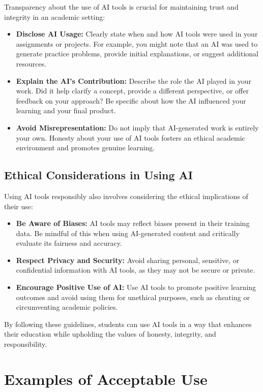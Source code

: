 \documentclass{article}
\begin{document}
Transparency about the use of AI tools is crucial for maintaining trust and integrity in an academic setting:

\begin{itemize}
    \item \textbf{Disclose AI Usage:} Clearly state when and how AI tools were used in your assignments or projects. For example, you might note that an AI was used to generate practice problems, provide initial explanations, or suggest additional resources.
    \item \textbf{Explain the AI’s Contribution:} Describe the role the AI played in your work. Did it help clarify a concept, provide a different perspective, or offer feedback on your approach? Be specific about how the AI influenced your learning and your final product.
    \item \textbf{Avoid Misrepresentation:} Do not imply that AI-generated work is entirely your own. Honesty about your use of AI tools fosters an ethical academic environment and promotes genuine learning.
\end{itemize}

\subsection{Ethical Considerations in Using AI}

Using AI tools responsibly also involves considering the ethical implications of their use:

\begin{itemize}
    \item \textbf{Be Aware of Biases:} AI tools may reflect biases present in their training data. Be mindful of this when using AI-generated content and critically evaluate its fairness and accuracy.
    \item \textbf{Respect Privacy and Security:} Avoid sharing personal, sensitive, or confidential information with AI tools, as they may not be secure or private.
    \item \textbf{Encourage Positive Use of AI:} Use AI tools to promote positive learning outcomes and avoid using them for unethical purposes, such as cheating or circumventing academic policies.
\end{itemize}

By following these guidelines, students can use AI tools in a way that enhances their education while upholding the values of honesty, integrity, and responsibility.


\section{Examples of Acceptable Use}
\end{document}
